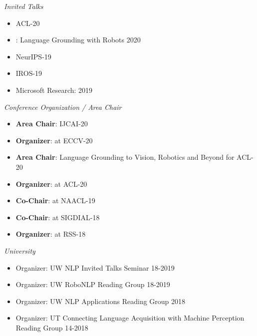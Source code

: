 \documentclass{res}
\newcommand{\citehref}[2]{\href{#1}{\color{darkblue}{#2}}}
\begin{document}
\begin{resume}
{\sl Invited Talks}
  \begin{itemize}
    \item \citehref{https://sites.google.com/view/2ndnlp4convai/}{Workshop on NLP for Conversational AI} \hfill ACL-20
    \item \citehref{https://www.cs.princeton.edu/courses/archive/spring20/cos598C/}{Princeton COS 598C}: Language Grounding with Robots \hfill 2020
    \item \citehref{https://vigilworkshop.github.io/}{Visually Grounded Interaction and Language (ViGIL) Workshop} \hfill NeurIPS-19
    \item \citehref{https://sites.google.com/view/spar2019/speakers}{Semantic Policy and Action Representations for Autonomous Robots (SPAR) Workshop} \hfill IROS-19
    \item Microsoft Research: \citehref{https://www.youtube.com/watch?v=XL3FMpceYoE}{Vision-and-Dialog Navigation} \hfill 2019
  \end{itemize}

{\sl Conference Organization / Area Chair}
  \begin{itemize}
    \item \textbf{Area Chair}: IJCAI-20
    \item \textbf{Organizer}: \citehref{https://askforalfred.com/EVAL/}{Embodied Vision, Actions \& Language Workshop (EVAL)} at ECCV-20
    \item \textbf{Area Chair}: Language Grounding to Vision, Robotics and Beyond for ACL-20
    \item \textbf{Organizer}: \citehref{https://alvr-workshop.github.io/}{First Workshop on Advances in Language and Vision Research (ALVR)} at ACL-20
    \item \textbf{Co-Chair}: \citehref{https://splu-robonlp.github.io/}{Combined Workshop on Spatial Language Understanding (SpLU) and Grounded Communication for Robotics (RoboNLP)} at NAACL-19
    \item \textbf{Co-Chair}: \citehref{https://robodial.github.io/}{Special Session on Physically Situated Dialog (RoboDIAL)} at SIGDIAL-18
    \item \textbf{Organizer}: \citehref{http://www2.ece.rochester.edu/projects/rail/mrhrc2018/}{Workshop on Communicating with Robots Naturally (CWRN)} at RSS-18
  \end{itemize}

{\sl University}
\begin{itemize}
    \item Organizer: UW NLP Invited Talks Seminar \hfill 18-2019
    \item Organizer: UW RoboNLP Reading Group \hfill 18-2019
    \item Organizer: UW NLP Applications Reading Group \hfill 2018
    \item Organizer: UT Connecting Language Acquisition with Machine Perception Reading Group \hfill 14-2018
  \end{itemize}


\end{resume}
\end{document}
